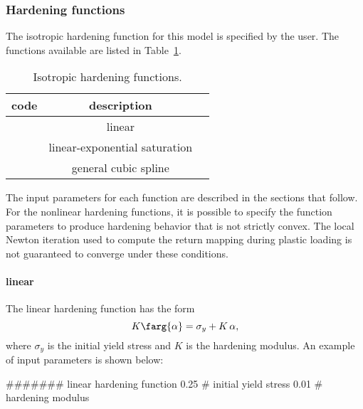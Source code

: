 \subsubsection{Hardening functions}
\label{sect.hardening.functions}
The isotropic hardening function for this model is specified by the 
user. The functions available are listed 
in Table~\ref{tab.hardening.functions.iso}.
\begin{table}[h]
\caption{\label{tab.hardening.functions.iso} Isotropic hardening 
functions.}
\begin{center}
\begin{tabular}[c]{|l|c|c|}
\hline
 \parbox[b]{0.75in}{\centering \textbf{code}}
&\parbox[b]{2.5in}{\raggedright \textbf{description}}\\
\hline
\parbox[b]{0.75in}{} & 
\parbox[b]{2.5in}{\raggedright linear}\\
\hline
\parbox[b]{0.75in}{} & 
\parbox[b]{2.5in}{\raggedright linear-exponential saturation}\\
\hline
\parbox[b]{0.75in}{}  & 
\parbox[b]{2.5in}{\raggedright general cubic spline}\\
\hline
\end{tabular}
\end{center}
\end{table}
The input parameters for each function are described in the sections 
that follow. For the 
nonlinear hardening functions, it is possible to specify the function 
parameters to produce hardening behavior that is not strictly convex. 
The local Newton iteration used to compute the return mapping during 
plastic loading is not guaranteed to converge under these conditions.

\paragraph{linear}
The linear hardening function has the form
\begin{equation}
K\farg{\alpha} = \sigma_{y} + K\,\alpha,
\end{equation}
where $\sigma_{y}$ is the initial yield stress and $K$ is the 
hardening modulus. An example of input parameters is shown below:
\begin{inputfile}
####### linear hardening function
0.25  # initial yield stress
0.01  # hardening modulus
\end{inputfile}	

